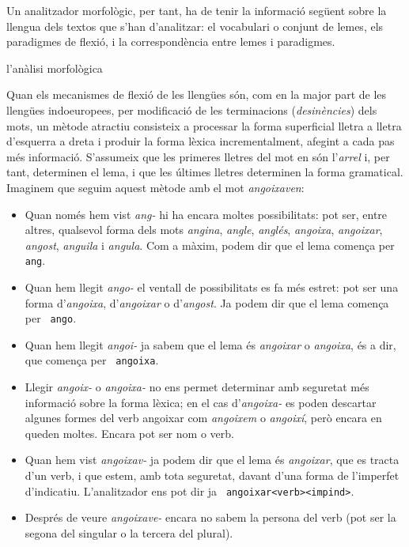 Un analitzador morfològic, per tant, ha de tenir la informació
següent sobre la llengua dels textos que s'han d'analitzar:
el vocabulari o conjunt de lemes, els paradigmes de
flexió, i la correspondència entre lemes i paradigmes.

\begin{persabermes}{l'anàlisi morfològica}

Quan els mecanismes de flexió de les llengües són, com en
la major part de les llengües indoeuropees, per modificació de
les terminacions (\emph{desi\-nèn\-cies}) dels mots, un mètode
atractiu consisteix a processar la forma superficial lletra a lletra
d'esquerra a dreta
i produir la forma lèxica incrementalment, afegint a cada pas
més informació. S'assumeix que les primeres lletres del mot en són l'\emph{arrel}
i, per tant, determinen el lema, i que les últimes lletres
determinen la forma gramatical. Imaginem que seguim aquest mètode
amb el mot \emph{angoixaven}:
\begin{itemize}
\item Quan només hem vist \emph{ang-} hi ha encara
moltes possibilitats: pot ser, entre altres, qualsevol forma dels mots
\emph{angina}, \emph{angle}, \emph{anglés}, \emph{angoixa}, \emph{angoixar}, \emph{angost}, {\em
  anguila} i \emph{angula}. Com a màxim, podem dir que el lema
comença per {\tt ang}.
\item Quan hem llegit \emph{ango-} el ventall de possibilitats es fa
  més estret: pot ser una forma d'\emph{angoixa}, d'\emph{angoixar}
  o  d'\emph{angost}. Ja podem dir que el lema comença per {\tt
    ango}.
\item Quan hem llegit \emph{angoi-} ja sabem que el lema és 
\emph{angoixar} o \emph{angoixa}, és a dir, que comença per {\tt
  angoixa}. 
\item Llegir \emph{angoix-} o \emph{angoixa-} 
no ens permet determinar amb seguretat més informació sobre la
forma lèxica; en el cas d'\emph{angoixa-} es poden descartar algunes formes del
verb angoixar com \emph{angoixem} o \emph{angoixí}, però encara
en queden moltes. Encara pot ser nom o verb.
\item Quan hem vist \emph{angoixav-} ja podem dir que el lema és
  \emph{angoixar}, que es tracta d'un verb, i que estem, amb tota
  seguretat, davant d'una forma de l'imperfet
  d'indicatiu. L'analitzador ens pot dir ja {\tt
    angoixar<verb>\-<impind>}.
\item Després de veure \emph{angoixave-} encara no sabem la persona
  del verb (pot ser la segona del singular o la tercera del plural).

\end{itemize}
\end{persabermes}
